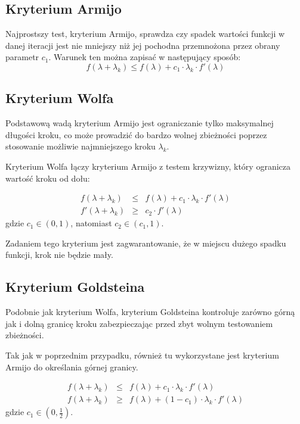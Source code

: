 \documentclass{classrep}
\begin{document}
\subsection{Kryterium Armijo}
Najprostszy test, kryterium Armijo, sprawdza czy spadek wartości funkcji w danej iteracji jest nie mniejszy niż jej pochodna przemnożona przez obrany parametr $c_1$. Warunek ten można zapisać w następujący sposób:
\begin{equation}
 f(\lambda + \lambda_k) \leq f(\lambda) + c_1 \cdot \lambda_k \cdot f'(\lambda)
\end{equation}

\subsection{Kryterium Wolfa}
Podstawową wadą kryterium Armijo jest ograniczanie tylko maksymalnej długości kroku, co może prowadzić do bardzo wolnej zbieżności \ppauza poprzez stosowanie możliwie najmniejszego kroku $\lambda_k$.

Kryterium Wolfa łączy kryterium Armijo z testem krzywizny, który ogranicza wartość kroku od dołu:

\begin{eqnarray}
    f(\lambda + \lambda_k)  & \leq & f(\lambda) + c_1 \cdot \lambda_k \cdot f'(\lambda) \\
    f'(\lambda + \lambda_k) & \geq & c_2 \cdot f'(\lambda)
\end{eqnarray}
gdzie $c_1 \in (0, 1)$, natomiast $c_2 \in (c_1, 1)$.

Zadaniem tego kryterium jest zagwarantowanie, że w miejscu dużego spadku funkcji, krok nie będzie mały.

\subsection{Kryterium Goldsteina}
Podobnie jak kryterium Wolfa, kryterium Goldsteina kontroluje zarówno górną jak i dolną granicę kroku zabezpieczając przed zbyt wolnym testowaniem zbieżności.

Tak jak w poprzednim przypadku, również tu wykorzystane jest kryterium Armijo do określania górnej granicy.

\begin{eqnarray}
    f(\lambda + \lambda_k) & \leq & f(\lambda) + c_1 \cdot \lambda_k \cdot f'(\lambda) \\
    f(\lambda + \lambda_k) & \geq & f(\lambda) + (1 - c_1) \cdot \lambda_k \cdot f'(\lambda)
\end{eqnarray}
gdzie $c_1 \in (0, \frac{1}{2})$.
\end{document}
